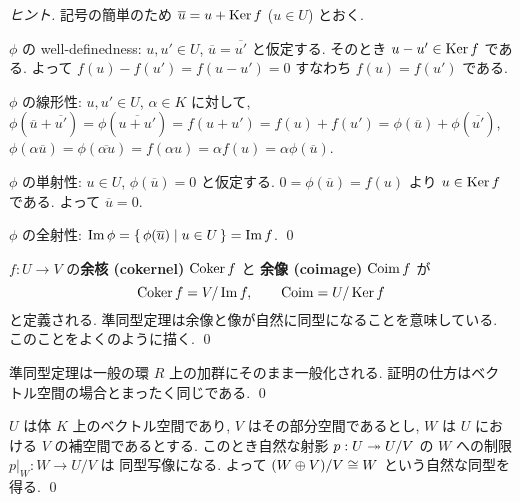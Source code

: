 \documentclass[12pt,twoside]{jarticle}
\begin{document}

\begin{proof}[ヒント]
  記号の簡単のため $\overline{u}=u+\mathop{\mathrm{Ker}}\nolimits f$ ($u\in U$) とおく.
  
  $\phi$ の well-definedness: $u,u'\in U$, 
  $\overline{u}=\overline{u'}$ と仮定する.  
  そのとき $u-u'\in\mathop{\mathrm{Ker}}\nolimits f$ である.
  よって $f(u)-f(u')=f(u-u')=0$ すなわち $f(u)=f(u')$ である.

  $\phi$ の線形性: $u,u'\in U$, $\alpha\in K$ に対して, %
  $\phi(\overline{u}+\overline{u'})
  = \phi(\overline{u+u'})
  = f(u+u') 
  = f(u) + f(u') 
  = \phi(\overline{u}) + \phi(\overline{u'})$,
  $\phi(\alpha\overline{u}) 
  = \phi(\overline{\alpha u})
  = f(\alpha u)
  = \alpha f(u)
  = \alpha\phi(\overline{u})$. 
  
  $\phi$ の単射性: $u\in U$, $\phi(\overline{u})=0$ と仮定する.
  $0 = \phi(\overline{u}) = f(u)$ より $u\in\mathop{\mathrm{Ker}}\nolimits f$ である.
  よって $\overline{u}=0$.
  
  $\phi$ の全射性: $\mathop{\mathrm{Im}}\nolimits\phi =
  \{\,\phi(\overline{u})\mid u\in U\,\} = \mathop{\mathrm{Im}}\nolimits f$.
  \qed
\end{proof}


\begin{guide}
  $f:U\to V$ の{\bf 余核 (cokernel)} $\mathop{\mathrm{Coker}}\nolimits f$ と
  {\bf 余像 (coimage)} $\mathop{\mathrm{Coim}}\nolimits f$ が
  \begin{equation*}
    \mathop{\mathrm{Coker}}\nolimits f = V/\mathop{\mathrm{Im}}\nolimits f, \qquad \mathop{\mathrm{Coim}}\nolimits = U/\mathop{\mathrm{Ker}}\nolimits f
  \end{equation*}
  と定義される.  準同型定理は余像と像が自然に同型になることを意味している.
  このことをよくのように描く.
  \qed
\end{guide}


\begin{guide}
  準同型定理は一般の環 $R$ 上の加群にそのまま一般化される.
  証明の仕方はベクトル空間の場合とまったく同じである.
  \qed
\end{guide}


\begin{question}[10点]
  \label{q:W=Imf}
  $U$ は体 $K$ 上のベクトル空間であり, $V$ はその部分空間であるとし,
  $W$ は $U$ における $V$ の補空間であるとする.
  このとき自然な射影 $p:U\twoheadrightarrow U/V$ の $W$ への制限 $p|_W:W\to U/V$ は
  同型写像になる. よって $(W\oplus V)/V\cong W$ という自然な同型を得る.
  \qed
\end{question}
\end{document}
